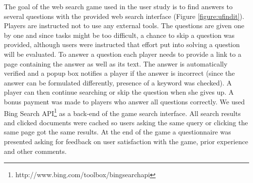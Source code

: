 The goal of the web search game used in the user study is to find answers to several questions with the provided web search interface (Figure \ref{figure:ufindit}). 
Players are instructed not to use any external tools.
The questions are given one by one and since tasks might be too difficult, a chance to skip a question was provided, although users were instructed that effort put into solving a question will be evaluated.
To answer a question each player needs to provide a link to a page containing the answer as well as its text.
The answer is automatically verified and a popup box notifies a player if the answer is incorrect (since the answer can be formulated differently, presence of a keyword was checked).
A player can then continue searching or skip the question when she gives up.
A bonus payment was made to players who answer all questions correctly.
We used Bing Search API\footnote{http://www.bing.com/toolbox/bingsearchapi} as a back-end of the game search interface.
All search results and clicked documents were cached so users asking the same query or clicking the same page got the same results.
At the end of the game a questionnaire was presented asking for feedback on user satisfaction with the game, prior experience and other comments.

